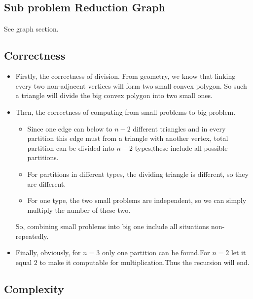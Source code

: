 \documentclass[]{article}
\begin{document}
        \subsection{Sub problem Reduction Graph}
            \paragraph{}See graph section.
        \subsection{Correctness}
        \begin{itemize}
            \item Firstly, the correctness of division. From geometry, we know that linking every two non-adjacent vertices will form two small convex polygon. So such a triangle will divide the big convex polygon into two small ones. 
            \item Then, the correctness of computing from small problems to big problem.
            \begin{itemize}
                \item Since one edge can below to $n-2$ different triangles and in every partition this edge must from a triangle with another vertex, total partition can be divided into $n-2$ types,these include all possible partitions.
                \item For partitions in different types, the dividing triangle is different, so they are different.
                \item For one type, the two small problems are independent, so we can simply multiply the number of these two.
            \end{itemize}
            So, combining small problems into big one include all situations non-repeatedly.
             
            \item Finally, obviously, for $n=3$ only one partition can be found.For $n=2$ let it equal $2$ to make it computable for multiplication.Thus the recursion will end.
        \end{itemize}
        \subsection{Complexity}
\end{document}
